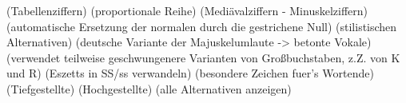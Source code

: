 \documentclass{fontdoku}
\begin{document}
 (Tabellenziffern)
 (proportionale Reihe)
 (Mediävalziffern - Minuskelziffern)
 (automatische Ersetzung der normalen durch die gestrichene Null)
 (stilistischen Alternativen)
 (deutsche Variante der Majuskelumlaute -> betonte Vokale)
 (verwendet teilweise geschwungenere Varianten von Großbuchstaben, z.Z. von K und R)
 (Eszetts in SS/ss verwandeln)
 (besondere Zeichen fuer's Wortende)
 (Tiefgestellte)
 (Hochgestellte)
 (alle Alternativen anzeigen)


%
%
%
%
%
\end{document}
